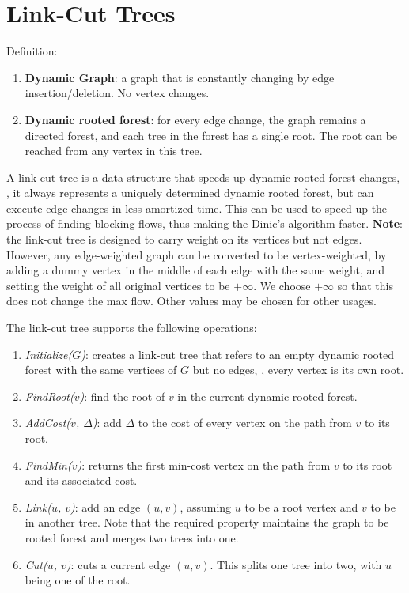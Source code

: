 \section{Link-Cut Trees}

Definition:
\begin{enumerate}
    \item \textbf{Dynamic Graph}: a graph that is constantly changing by edge insertion/deletion. No vertex changes.
    \item \textbf{Dynamic rooted forest}: for every edge change, the graph remains a directed forest, and each tree in the forest has a single root. The root can be reached from any vertex in this tree.
\end{enumerate}

A link-cut tree is a data structure that speeds up dynamic rooted forest changes, \ie, it always represents a uniquely determined dynamic rooted forest, but can execute edge changes in less amortized time. This can be used to speed up the process of finding blocking flows, thus making the Dinic's algorithm faster. \textbf{Note}: the link-cut tree is designed to carry weight on its vertices but not edges. However, any edge-weighted graph can be converted to be vertex-weighted, by adding a dummy vertex in the middle of each edge with the same weight, and setting the weight of all original vertices to be $+\infty$. We choose $+\infty$ so that this does not change the max flow. Other values may be chosen for other usages.

The link-cut tree supports the following operations:
\begin{enumerate}
    \item \emph{Initialize($G$)}: creates a link-cut tree that refers to an empty dynamic rooted forest with the same vertices of $G$ but no edges, \ie, every vertex is its own root.
    \item \emph{FindRoot($v$)}: find the root of $v$ in the current dynamic rooted forest.
    \item \emph{AddCost($v$, $\Delta$)}: add $\Delta$ to the cost of every vertex on the path from $v$ to its root.
    \item \emph{FindMin($v$)}: returns the first min-cost vertex on the path from $v$ to its root and its associated cost.
    \item \emph{Link($u$, $v$)}: add an edge $(u, v)$, assuming $u$ to be a root vertex and $v$ to be in another tree. Note that the required property maintains the graph to be rooted forest and merges two trees into one.
    \item \emph{Cut($u$, $v$)}: cuts a current edge $(u,v)$. This splits one tree into two, with $u$ being one of the root.
\end{enumerate}

